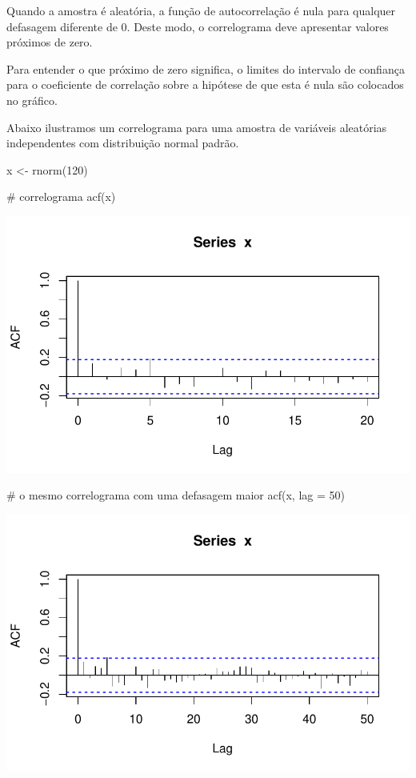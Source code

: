 \documentclass[
  letterpaper,
  DIV=11,
  numbers=noendperiod]{scrreprt}
\newenvironment{Shaded}{\begin{snugshade}}{\end{snugshade}}
\newcommand{\AttributeTok}[1]{\textcolor[rgb]{0.40,0.45,0.13}{#1}}
\newcommand{\CommentTok}[1]{\textcolor[rgb]{0.37,0.37,0.37}{#1}}
\newcommand{\DecValTok}[1]{\textcolor[rgb]{0.68,0.00,0.00}{#1}}
\newcommand{\FunctionTok}[1]{\textcolor[rgb]{0.28,0.35,0.67}{#1}}
\newcommand{\NormalTok}[1]{\textcolor[rgb]{0.00,0.23,0.31}{#1}}
\newcommand{\OtherTok}[1]{\textcolor[rgb]{0.00,0.23,0.31}{#1}}
\begin{document}
Quando a amostra é aleatória, a função de autocorrelação é nula para
qualquer defasagem diferente de 0. Deste modo, o correlograma deve
apresentar valores próximos de zero.

Para entender o que próximo de zero significa, o limites do intervalo de
confiança para o coeficiente de correlação sobre a hipótese de que esta
é nula são colocados no gráfico.

Abaixo ilustramos um correlograma para uma amostra de variáveis
aleatórias independentes com distribuição normal padrão.

\begin{Shaded}
\begin{Highlighting}[]
\NormalTok{x }\OtherTok{\textless{}{-}} \FunctionTok{rnorm}\NormalTok{(}\DecValTok{120}\NormalTok{)}

\CommentTok{\# correlograma}
\FunctionTok{acf}\NormalTok{(x)}
\end{Highlighting}
\end{Shaded}

\includegraphics{sinal_files/figure-pdf/unnamed-chunk-4-1.pdf}

\begin{Shaded}
\begin{Highlighting}[]
\CommentTok{\# o mesmo correlograma com uma defasagem maior}
\FunctionTok{acf}\NormalTok{(x, }\AttributeTok{lag =} \DecValTok{50}\NormalTok{)}
\end{Highlighting}
\end{Shaded}

\includegraphics{sinal_files/figure-pdf/unnamed-chunk-4-2.pdf}
\end{document}
